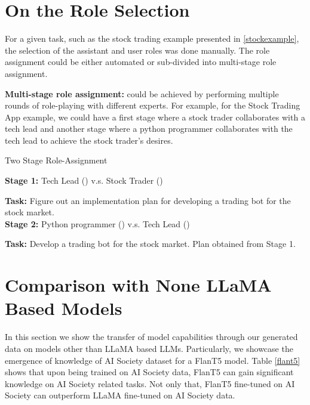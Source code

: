 \newpage

\section{On the Role Selection}

For a given task, such as the stock trading example presented in \ref{stockexample}, the selection of the assistant and user roles was done manually. The role assignment could be either automated or sub-divided into multi-stage role assignment. 


\textbf{Multi-stage role assignment:} could be achieved by performing multiple rounds of role-playing with different experts. For example, for the Stock Trading App example, we could have a first stage where a stock trader collaborates with a tech lead and another stage where a python programmer collaborates with the tech lead to achieve the stock trader's desires.

\begin{AIBox}{Two Stage Role-Assignment}

\textbf{Stage 1:} Tech Lead (\assistant) v.s. Stock Trader (\user)

\textbf{Task:} Figure out an implementation plan for developing a trading bot for the stock market. \\

\textbf{Stage 2:} Python programmer (\assistant) v.s. Tech Lead (\user)

\textbf{Task:} Develop a trading bot for the stock market. {Plan obtained from Stage 1}.

\end{AIBox}




\clearpage

\section{Comparison with None LLaMA Based Models}

In this section we show the transfer of model capabilities through our generated data on models other than LLaMA based LLMs. Particularly, we showcase the emergence of knowledge of AI Society dataset for a FlanT5 model. Table \ref{flant5} shows that upon being trained on AI Society data, FlanT5 can gain significant knowledge on AI Society related tasks. Not only that, FlanT5 fine-tuned on AI Society can outperform LLaMA fine-tuned on AI Society data.


